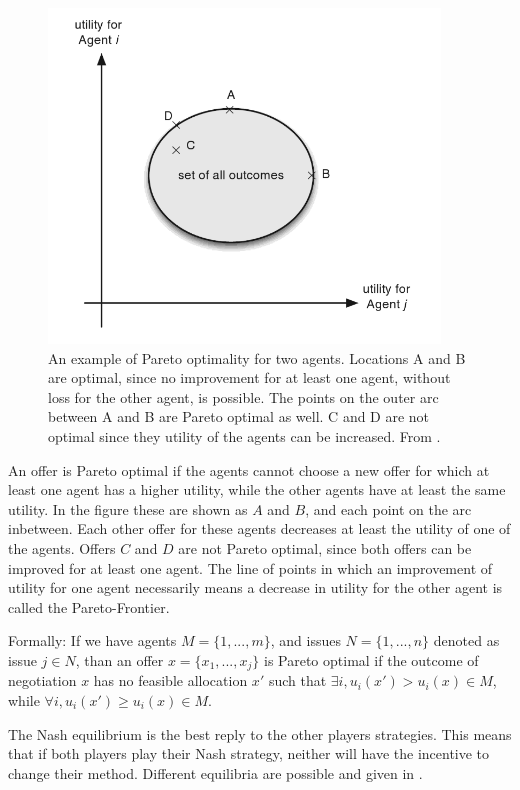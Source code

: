\begin{figure}[h]
	\centering
	\includegraphics[width=0.7\linewidth]{img/parito_optimal.png}
	\caption{An example of Pareto optimality for two agents. Locations A and B are optimal, since no improvement for at least one agent, without loss for the other agent, is possible. The points on the outer arc between A and B are Pareto optimal as well. C and D are not optimal since they utility of the agents can be increased. From \citep{fatima2014principles}.}
	\label{fig:paritooptimal}
\end{figure}

An offer is Pareto optimal if the agents cannot choose a new offer for which at least one agent has a higher utility, while the other agents have at least the same utility. In the figure these are shown as $A$ and $B$, and each point on the arc inbetween. Each other offer for these agents decreases at least the utility of one of the agents. Offers $C$ and $D$ are not Pareto optimal, since both offers can be improved for at least one agent. The line of points in which an improvement of utility for one agent necessarily means a decrease in utility for the other agent is called the Pareto-Frontier. 

Formally: If we have agents $M = \{1,...,m\}$, and issues $N = \{1,...,n\}$ denoted as issue $j\in N$, than an offer $x = \{x_1, ..., x_j\}$ is Pareto optimal if the outcome of negotiation $x$ has no feasible allocation $x'$ such that $ \exists i, u_i(x')> u_i(x) \in M$, while $\forall i, u_i(x')\geq u_i(x)  \in M$. 

The Nash equilibrium is the best reply to the other players strategies. This means that if both players play their Nash strategy, neither will have the incentive to change their method. Different equilibria are possible and given in \citep{trappey2013multi}. 

